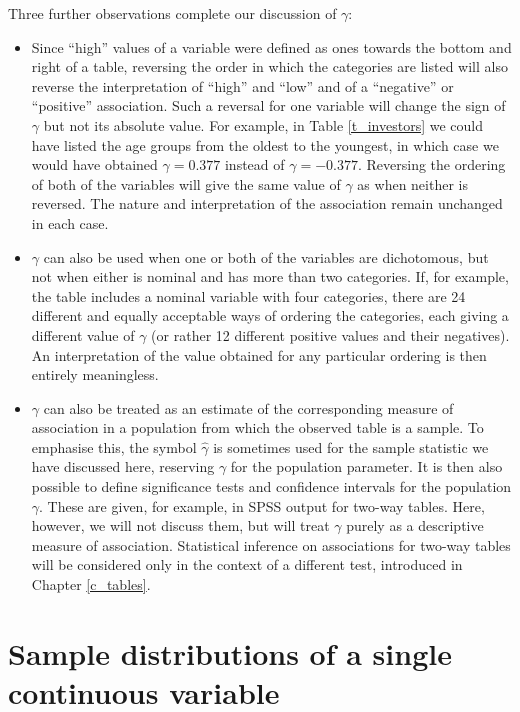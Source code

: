 Three further observations complete our discussion of
$\gamma$:
\begin{itemize}
\item
Since ``high'' values of a variable were defined as ones towards
the bottom and right of a table, reversing the order in which the
categories are listed will also reverse the interpretation of ``high''
and ``low'' and of a ``negative'' or ``positive'' association. Such a
reversal for one variable will change the sign of $\gamma$ but not its
absolute value. For example, in Table \ref{t_investors} we could have
listed the age groups from the oldest to the youngest, in which case we
would have obtained $\gamma=0.377$ instead of $\gamma=-0.377$. Reversing
the ordering of both of the variables will give the same value of
$\gamma$ as when neither is reversed. The nature and interpretation
of the association
remain unchanged in each case.
\item
$\gamma$ can also be used when one or both of the variables
are dichotomous, but not when either is nominal and has more
than two categories. If, for example, the table includes a nominal
variable with four categories, there are 24 different and equally acceptable
ways of ordering the categories, each giving a different value of
$\gamma$ (or rather 12 different positive values and their negatives).
An interpretation of the value obtained for any particular ordering is
then entirely meaningless.
\item
$\gamma$ can also be treated as an estimate of the corresponding measure
of association in a population from which the observed table is a
sample. To emphasise this, the symbol $\hat{\gamma}$ is
sometimes used for the
sample statistic we have discussed here, reserving $\gamma$
for the population parameter. It is then also possible to
define significance tests and
confidence intervals for the population
$\gamma$.
These are given, for example, in SPSS output for two-way tables.
Here, however, we will not discuss them, but will treat $\gamma$
purely as a descriptive measure of association. Statistical inference
on associations for two-way tables will be considered only in the
context of a different test, introduced in Chapter \ref{c_tables}.
\end{itemize}

\section{Sample distributions of a single continuous variable}
\label{s_descr1_1cont}


